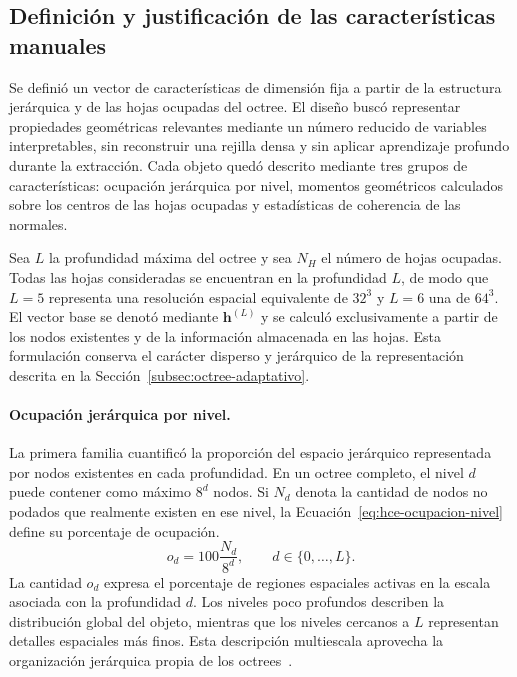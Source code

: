\subsection{Definición y justificación de las características manuales}
\label{subsec:definicion-caracteristicas-hce}

Se definió un vector de características de dimensión fija a partir de la estructura jerárquica y de las hojas ocupadas del octree. El diseño buscó representar propiedades geométricas relevantes mediante un número reducido de variables interpretables, sin reconstruir una rejilla densa y sin aplicar aprendizaje profundo durante la extracción. Cada objeto quedó descrito mediante tres grupos de características: ocupación jerárquica por nivel, momentos geométricos calculados sobre los centros de las hojas ocupadas y estadísticas de coherencia de las normales.

Sea $L$ la profundidad máxima del octree y sea $N_H$ el número de hojas ocupadas. Todas las hojas consideradas se encuentran en la profundidad $L$, de modo que $L=5$ representa una resolución espacial equivalente de $32^3$ y $L=6$ una de $64^3$. El vector base se denotó mediante $\mathbf h^{(L)}$ y se calculó exclusivamente a partir de los nodos existentes y de la información almacenada en las hojas. Esta formulación conserva el carácter disperso y jerárquico de la representación descrita en la Sección~\ref{subsec:octree-adaptativo}.

\paragraph{Ocupación jerárquica por nivel.}

La primera familia cuantificó la proporción del espacio jerárquico representada por nodos existentes en cada profundidad. En un octree completo, el nivel $d$ puede contener como máximo $8^d$ nodos. Si $N_d$ denota la cantidad de nodos no podados que realmente existen en ese nivel, la Ecuación~\eqref{eq:hce-ocupacion-nivel} define su porcentaje de ocupación.
\begin{equation}
o_d=100\frac{N_d}{8^d},
\qquad d\in\{0,\ldots,L\}.
\label{eq:hce-ocupacion-nivel}
\end{equation}
La cantidad $o_d$ expresa el porcentaje de regiones espaciales activas en la escala asociada con la profundidad $d$. Los niveles poco profundos describen la distribución global del objeto, mientras que los niveles cercanos a $L$ representan detalles espaciales más finos. Esta descripción multiescala aprovecha la organización jerárquica propia de los octrees~\parencite{samet}.

